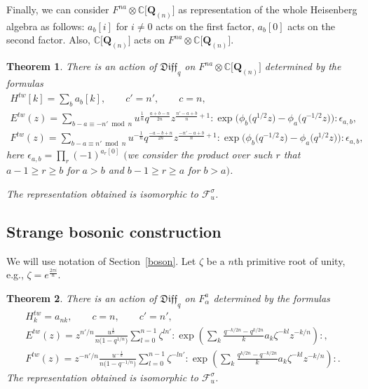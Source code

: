 \documentclass[pdftex]{sigma}
\numberwithin{equation}{section}
\newtheorem{Theorem}{Theorem}[section]
\theoremstyle{definition}
\newcommand{\qD}{\mathfrak{Diff}_q}
\newcommand{\Q}{\mathbf{Q}_{(n)}}
\begin{document}
Finally, we can consider $F^{na} \otimes \mathbb{C} \big[ \Q \big]$ as representation of the whole Heisenberg algebra as follows: $a_b[i]$ for $i \neq 0$ acts on the first factor, $a_b[0]$ acts on the second factor. Also, $\mathbb{C} \big[ \Q \big]$ acts on $F^{na} \otimes \mathbb{C} \big[ \Q \big]$.

\begin{Theorem} \label{Th:qD Boson}
There is an action of $\qD$ on $F^{na} \otimes \mathbb{C} \big[ \Q \big]$ determined by the formulas
\begin{gather}
H^{tw}[k] = \sum_{b} a_b [k], \qquad c' = n', \qquad c=n,\nonumber\\
E^{tw}(z) = \sum_{b-a \equiv -n' \bmod n} \!\!\!\!\! u^{\frac{1}{n}} q^{\frac{a+b-n}{2n}} z^{\frac{n'-a+b}{n}+1} : \! \exp \big( \phi_b\big(q^{1/2} z\big) - \phi_a\big(q^{-1/2} z\big) \big) \! : \epsilon_{a,b}, \label{eq:th:Etw boson}\\
F^{tw}(z) = \sum_{b-a \equiv n' \bmod n} \!\!\!\!\! u^{-\frac{1}{n}} q^{ \frac{-a-b+n}{2n} } z^{\frac{-n'-a+b}{n}+1} : \! \exp \big( \phi_b\big(q^{-1/2} z\big) - \phi_a\big(q^{1/2} z\big) \big) \! : \epsilon_{a,b}, \label{eq:th:Ftw boson}
\end{gather}
here $\epsilon_{a,b} = \prod_r (-1)^{a_r[0]}$ $($we consider the product over such $r$ that $a-1 \geqslant r \geqslant b$ for $a>b$ and $b-1 \geqslant r \geqslant a$ for $b>a)$.

The representation obtained is isomorphic to $\mathcal{F}_u^{\sigma}$.
\end{Theorem}

\subsection{Strange bosonic construction}

We will use notation of Section~\ref{boson}. Let $\zeta$ be a $n$th primitive root of unity, e.g., $\zeta = e^{\frac{2\pi i}{n}}$.

\begin{Theorem} \label{Th:StrangeBoson}
There is an action of $\qD$ on $F^a_{\alpha}$ determined by the formulas
\begin{gather}
H^{tw}_k = a_{nk}, \qquad c =n, \qquad c' = n',\nonumber\\
 E^{tw}(z) = z^{n'/n} \frac{u^{\frac{1}{n}}}{n\big(1-q^{1/n}\big)} \sum_{l=0}^{n-1} \zeta^{l n'} : \! \exp \! \left( \sum_{k} \frac{q^{-k/2n}-q^{k/2n}}{k} a_{k} \zeta^{-kl} z^{-k/n} \right) \! :, \label{eq:Th Strange boson E} \\
 F^{tw}(z) = z^{-n'/n} \frac{u^{-\frac{1}{n}}}{n\big(1-q^{-1/n}\big)} \sum_{l=0}^{n-1} \zeta^{-l n'} : \! \exp \! \left( \sum_{k}\frac{q^{k/2n}-q^{-k/2n}}{k} a_{k} \zeta^{-kl} z^{-k/n} \right) \! : . \label{eq:Th Strange boson F}
\end{gather}
The representation obtained is isomorphic to $\mathcal{F}_u^{\sigma}$.
\end{Theorem}
\end{document}
